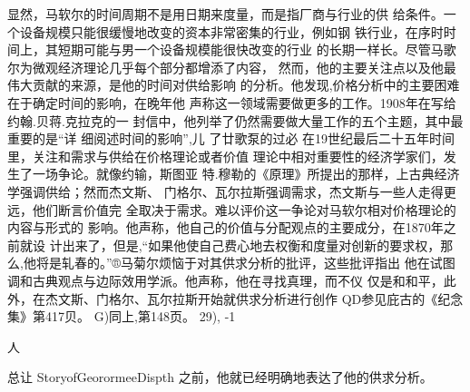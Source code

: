 显然，马软尔的时间周期不是用日期来度量，而是指厂商与行业的供
给条件。一个设备规模只能很缓慢地改变的资本非常密集的行业，例如钢
铁行业，在序时时间上，其短期可能与男一个设备规模能很快改变的行业
的长期一样长。尽管马歌尔为微观经济理论几乎每个部分都增添了内容，
然而，他的主要关注点以及他最伟大贡献的来源，是他的时间对供给影响
的分析。他发现,价格分析中的主要困难在于确定时间的影响，在晚年他
声称这一领域需要做更多的工作。1908年在写给约翰.贝蒋.克拉克的一
封信中，他列举了仍然需要做大量工作的五个主题，其中最重要的是“详
细阅述时间的影响”,儿
了廿歌泵的过必
在19世纪最后二十五年时间里，关注和需求与供给在价格理论或者价值
理论中相对重要性的经济学家们，发生了一场争论。就像约输，斯图亚
特.穆勒的《原理》所提出的那样，上古典经济学强调供给；然而杰文斯、
门格尔、瓦尔拉斯强调需求，杰文斯与一些人走得更远，他们断言价值完
全取决于需求。难以评价这一争论对马软尔相对价格理论的内容与形式的
影响。他声称，他自己的价值与分配观点的主要成分，在1870年之前就设
计出来了，但是,“如果他使自己费心地去权衡和度量对创新的要求权，那
么,他将是轧春的。”®马菊尔烦恼于对其供求分析的批评，这些批评指出
他在试图调和古典观点与边际效用学派。他声称，他在寻找真理，而不仪
仅是和和平，此外，在杰文斯、门格尔、瓦尔拉斯开始就供求分析进行创作
QD参见庇古的《纪念集》第417贝。
G)同上,第148页。
29),
-1

人

总让
StoryofGeorormeeDispth
之前，他就已经明确地表达了他的供求分析。

